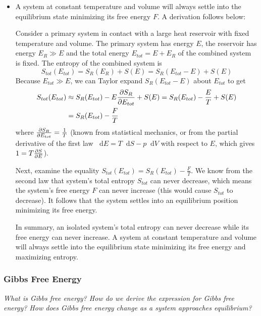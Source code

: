 \documentclass[11pt, a4paper]{article}
\newcommand{\diff}{\mathop{}\!\mathrm{d}} %
\begin{document}
\begin{itemize}
	
	\item A system at constant temperature and volume will always settle into the equilibrium state minimizing its free energy $ F $. A derivation follows below:
	
	Consider a primary system in contact with a large heat reservoir with fixed temperature and volume. The primary system has energy $ E $, the reservoir has energy $ E_{R} \gg E $ and the total energy $ E_{tot} = E + E_{R} $ of the combined system is fixed.  The entropy of the combined system is
	\begin{equation*}
		S_{tot}(E_{tot}) = S_{R}(E_{R}) + S(E) = S_{R}(E_{tot} - E) + S(E)
	\end{equation*}
	Because $ E_{tot} \gg E $, we can Taylor expand $ S_{R}(E_{tot} - E) $ about $ E_{tot} $ to get
	\begin{align*}
		S_{tot}(E_{tot}) &\approx S_{R}(E_{tot}) - E \pdv{S_{R}}{E_{tot}} + S(E) = S_{R}(E_{tot}) - \frac{E}{T} + S(E) \\
		&= S_{R}(E_{tot}) - \frac{F}{T}
	\end{align*}
	where $ \pdv{S_{R}}{E_{tot}} = \frac{1}{T} $ (known from statistical mechanics, or from the partial derivative of the first law $ \diff E = T \diff S - p \diff V $ with respect to $ E $, which gives $ 1 = T \pdv{S}{E} $).
	
	Next, examine the equality $ S_{tot}(E_{tot}) = S_{R}(E_{tot}) - \frac{F}{T} $. We know from the second law that system's total entropy $ S_{tot} $ can never decrease, which means the system's free energy $ F $ can never increase (this would cause $ S_{tot} $ to decrease). It follows that the system settles into an equilibrium position minimizing its free energy.
	
	In summary, an isolated system's total entropy can never decrease while its free energy can never increase. A system at constant temperature and volume will always settle into the equilibrium state minimizing its free energy and maximizing entropy.
	

\end{itemize}


\subsubsection{Gibbs Free Energy} \label{sss:gibbs_free_energy}
\textit{What is Gibbs free energy? How do we derive the expression for Gibbs free energy? How does Gibbs free energy change as a system approaches equilibrium?}
\end{document}

